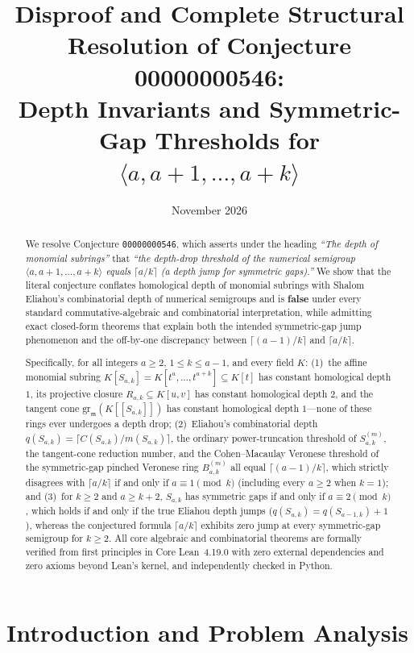 \documentclass[11pt]{amsart}
\title[Resolution of Conjecture 00000000546]{Disproof and Complete Structural Resolution of Conjecture 00000000546:\\
Depth Invariants and Symmetric-Gap Thresholds for $\langle a, a+1, \dots, a+k \rangle$}
\date{November 2026}
\theoremstyle{definition}
\theoremstyle{remark}
\newcommand{\mm}{\mathfrak{m}}
\newcommand{\gr}{\mathrm{gr}}
\begin{document}
\begin{abstract}
We resolve Conjecture \texttt{00000000546}, which asserts under the heading \emph{``The depth of monomial subrings''} that \emph{``the depth-drop threshold of the numerical semigroup $\langle a, a+1, \dots, a+k \rangle$ equals $\lceil a/k \rceil$ (a depth jump for symmetric gaps).''}
We show that the literal conjecture conflates homological depth of monomial subrings with Shalom Eliahou's combinatorial depth of numerical semigroups and is \textbf{false} under every standard commutative-algebraic and combinatorial interpretation, while admitting exact closed-form theorems that explain both the intended symmetric-gap jump phenomenon and the off-by-one discrepancy between $\lceil (a-1)/k \rceil$ and $\lceil a/k \rceil$.

Specifically, for all integers $a \ge 2$, $1 \le k \le a-1$, and every field $K$:
(1)~the affine monomial subring $K[S_{a,k}] = K[t^a, \dots, t^{a+k}] \subseteq K[t]$ has constant homological depth $1$, its projective closure $R_{a,k} \subseteq K[u,v]$ has constant homological depth $2$, and the tangent cone $\gr_{\mm}(K[[S_{a,k}]])$ has constant homological depth $1$---none of these rings ever undergoes a depth drop;
(2)~Eliahou's combinatorial depth $q(S_{a,k}) = \lceil C(S_{a,k})/m(S_{a,k}) \rceil$, the ordinary power-truncation threshold of $S_{a,k}^{(m)}$, the tangent-cone reduction number, and the Cohen--Macaulay Veronese threshold of the symmetric-gap pinched Veronese ring $B_{a,k}^{(m)}$ all equal $\lceil (a-1)/k \rceil$, which strictly disagrees with $\lceil a/k \rceil$ if and only if $a \equiv 1 \pmod{k}$ (including every $a \ge 2$ when $k = 1$); and
(3)~for $k \ge 2$ and $a \ge k+2$, $S_{a,k}$ has symmetric gaps if and only if $a \equiv 2 \pmod{k}$, which holds if and only if the true Eliahou depth jumps ($q(S_{a,k}) = q(S_{a-1,k}) + 1$), whereas the conjectured formula $\lceil a/k \rceil$ exhibits zero jump at every symmetric-gap semigroup for $k \ge 2$.
All core algebraic and combinatorial theorems are formally verified from first principles in Core Lean~4.19.0 with zero external dependencies and zero axioms beyond Lean's kernel, and independently checked in Python.
\end{abstract}

\maketitle
\enlargethispage{6pt}

\section{Introduction and Problem Analysis}
\end{document}
